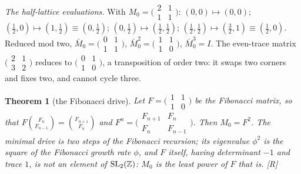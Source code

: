 \documentclass[11pt,a4paper]{article}
\theoremstyle{plain}
\newtheorem{theorem}{Theorem}[section]
\theoremstyle{definition}
\theoremstyle{remark}
\newcommand{\rigR}{[\textup{R}]}
\begin{document}
\emph{The half-lattice evaluations.} With $M_{0}=\bigl(\begin{smallmatrix}2&1\\1&1\end{smallmatrix}\bigr)$: $(0,0)\mapsto(0,0)$; $(\tfrac12,0)\mapsto(1,\tfrac12)\equiv(0,\tfrac12)$; $(0,\tfrac12)\mapsto(\tfrac12,\tfrac12)$; $(\tfrac12,\tfrac12)\mapsto(\tfrac32,1)\equiv(\tfrac12,0)$. Reduced mod two, $\bar M_{0}=\bigl(\begin{smallmatrix}0&1\\1&1\end{smallmatrix}\bigr)$, $\bar M_{0}^{2}=\bigl(\begin{smallmatrix}1&1\\1&0\end{smallmatrix}\bigr)$, $\bar M_{0}^{3}=I$. The even-trace matrix $\bigl(\begin{smallmatrix}2&1\\3&2\end{smallmatrix}\bigr)$ reduces to $\bigl(\begin{smallmatrix}0&1\\1&0\end{smallmatrix}\bigr)$, a transposition of order two: it swaps two corners and fixes two, and cannot cycle three.


\begin{theorem}[the Fibonacci drive]\label{thm:fibonacci}
Let $F=\bigl(\begin{smallmatrix}1&1\\1&0\end{smallmatrix}\bigr)$ be the Fibonacci matrix, so that $F\binom{F_{n}}{F_{n-1}}=\binom{F_{n+1}}{F_{n}}$ and $F^{n}=\bigl(\begin{smallmatrix}F_{n+1}&F_{n}\\F_{n}&F_{n-1}\end{smallmatrix}\bigr)$. Then $M_{0}=F^{2}$. The minimal drive is two steps of the Fibonacci recursion; its eigenvalue $\phi^{2}$ is the square of the Fibonacci growth rate $\phi$, and $F$ itself, having determinant $-1$ and trace $1$, is not an element of $\mathrm{SL}_{2}(\mathbb{Z})$: $M_{0}$ is the least power of $F$ that is. \rigR
\end{theorem}
\end{document}
